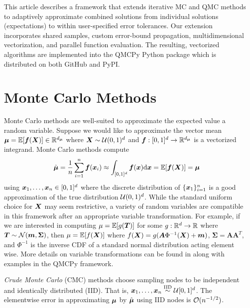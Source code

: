 \documentclass{article}[12pt]
\begin{document}
This article describes a framework that extends iterative MC and QMC methods to adaptively approximate combined solutions from individual solutions (expectations) to within user-specified error tolerances. Our extension incorporates shared samples, custom error-bound propagation, multidimensional vectorization, and parallel function evaluation. The resulting, vectorized algorithms are implemented into the QMCPy Python package \cite{QMCPy} which is distributed on both GitHub and PyPI. 

\section{Monte Carlo Methods} \label{sec:MCM}

Monte Carlo methods are well-suited to approximate the expected value a random variable. Suppose we would like to approximate the vector mean $\boldsymbol{\mu} = \mathbb{E}[\boldsymbol{f}(\boldsymbol{X})] \in \mathbb{R}^{d_{\boldsymbol{\mu}}}$ where $\boldsymbol{X}\sim\mathcal{U}(0,1)^{d}$ and  $\boldsymbol{f}: [0,1]^{d} \to \mathbb{R}^{d_{\boldsymbol{\mu}}}$ is a vectorized integrand. Monte Carlo methods compute 
\begin{equation*}
    \label{eq:mcapprox}
    \hat{\boldsymbol{\mu}} = \frac{1}{n}\sum_{i=1}^n \boldsymbol{f}(\boldsymbol{x}_i) \approx \int_{[0,1]^{d}}\boldsymbol{f}(\boldsymbol{x})\mathrm{d}\boldsymbol{x} = \mathbb{E}[\boldsymbol{f}(\boldsymbol{X})] = \boldsymbol{\mu}
\end{equation*}
using $\boldsymbol{x}_1,\dots,\boldsymbol{x}_n \in [0,1]^{d}$ where the discrete distribution of $\{\boldsymbol{x}_1\}_{i=1}^n$ is a good approximation of the true distribution $\mathcal{U}(0,1)^{d}$. While the standard uniform choice for $\boldsymbol{X}$ may seem restrictive, a variety of random variables are compatible in this framework after an appropriate variable transformation. For example, if we are interested in computing $\mu = \mathbb{E}[g(\boldsymbol{T})]$ for some $g: \mathbb{R}^{d} \to \mathbb{R}$ where $\boldsymbol{T} \sim \mathcal{N}(\boldsymbol{m},\boldsymbol{\Sigma})$, then $\mu = \mathbb{E}[f(\boldsymbol{X})]$ where $f(\boldsymbol{X})=g(\boldsymbol{A}\Phi^{-1}(\boldsymbol{X})+\boldsymbol{m})$, $\boldsymbol{\Sigma}=\boldsymbol{A}\boldsymbol{A}^T$, and $\Phi^{-1}$ is the inverse CDF of a standard normal distribution acting element wise. More details on variable transformations can be found in \cite{QMCSoftware} along with examples in the QMCPy framework.

\emph{Crude Monte Carlo} (CMC) methods choose sampling nodes to be independent and identically distributed (IID). That is, $\boldsymbol{x}_1,\dots,\boldsymbol{x}_n \overset{\text{IID}}{\sim} \mathcal{U}[0,1]^{d}$.
The elementwise error in approximating $\boldsymbol{\mu}$ by $\hat{\boldsymbol{\mu}}$ using IID nodes is  $\mathcal{O}(n^{-1/2})$. 
\end{document}
